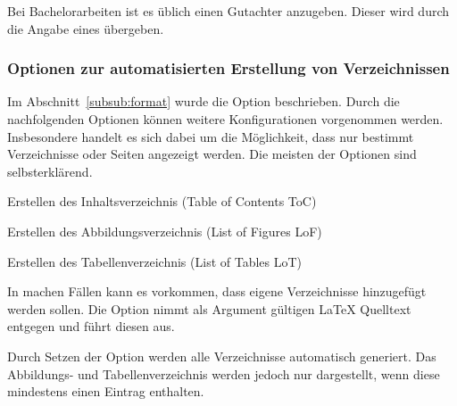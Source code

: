 \documentclass[babel=ngerman,highlight=false]{skdoc}
\begin{document}
                Bei Bachelorarbeiten  ist es üblich einen Gutachter anzugeben. Dieser wird durch die Angabe eines  übergeben.

            \subsubsection{Optionen zur automatisierten Erstellung von Verzeichnissen}\label{subsub:options-tocs}
                Im Abschnitt~\ref{subsub:format} wurde die Option  beschrieben. Durch die nachfolgenden Optionen können weitere Konfigurationen vorgenommen werden. Insbesondere handelt es sich dabei um die Möglichkeit, dass nur bestimmt Verzeichnisse oder Seiten angezeigt werden. Die meisten der Optionen sind selbsterklärend.\medskip

                \medskip

                \medskip

                \medskip

                Erstellen des Inhaltsverzeichnis (Table of Contents ToC)
                \medskip

                Erstellen des Abbildungsverzeichnis (List of Figures LoF)
                \medskip

                Erstellen des Tabellenverzeichnis (List of Tables LoT)
                \medskip

                In machen Fällen kann es vorkommen, dass eigene Verzeichnisse hinzugefügt werden sollen. Die Option  nimmt als Argument gültigen \LaTeX{} Quelltext entgegen und führt diesen aus.\medskip

                Durch Setzen der Option werden alle Verzeichnisse automatisch generiert. Das Abbildungs- und Tabellenverzeichnis werden jedoch nur dargestellt, wenn diese mindestens einen Eintrag enthalten.
                \medskip
\end{document}
